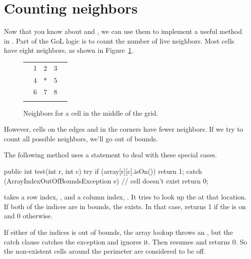 \section{Counting neighbors}


Now that you know about  and , we can use them to implement a useful method in .
Part of the GoL logic is to count the number of live neighbors.
Most cells have eight neighbors, as shown in Figure~\ref{fig:neighbors}.

\begin{figure}[!ht]
\begin{center}
\begin{tabular}{|p{1em}|p{1em}|p{1em}|p{1em}|p{1em}|}
\hline
  &   &   &   &   \\
\hline
  & 1 & 2 & 3 &   \\
\hline
  & 4 & * & 5 &   \\
\hline
  & 6 & 7 & 8 &   \\
\hline
  &   &   &   &   \\
\hline
\end{tabular}
\caption{Neighbors for a cell in the middle of the grid.}
\label{fig:neighbors}
\end{center}
\end{figure}

However, cells on the edges and in the corners have fewer neighbors.
If we try to count all possible neighbors, we'll go out of bounds.

The following method uses a  statement to deal with these special cases.

\begin{code}
public int test(int r, int c) {
    try {
        if (array[r][c].isOn()) {
            return 1;
        }
    } catch (ArrayIndexOutOfBoundsException e) {
        // cell doesn't exist
    }
    return 0;
}
\end{code}

 takes a row index, , and a column index, .
It tries to look up the  at that location.
If both of the indices are in bounds, the  exists.
In that case,  returns 1 if the  is on and 0 otherwise.

If either of the indices is out of bounds, the array lookup throws an , but the catch clause catches the exception and ignores it.
Then  resumes and returns 0.
So the non-existent cells around the perimeter are considered to be off.

